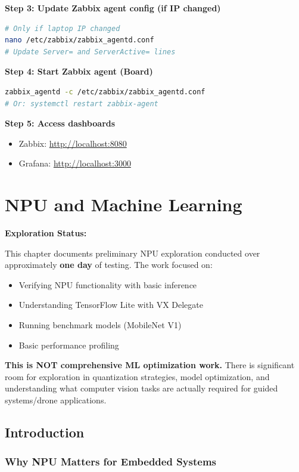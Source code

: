 \documentclass[12pt,a4paper]{report}
\begin{document}
\textbf{Step 3: Update Zabbix agent config (if IP changed)}
\begin{lstlisting}[language=bash]
# Only if laptop IP changed
nano /etc/zabbix/zabbix_agentd.conf
# Update Server= and ServerActive= lines
\end{lstlisting}

\textbf{Step 4: Start Zabbix agent (Board)}
\begin{lstlisting}[language=bash]
zabbix_agentd -c /etc/zabbix/zabbix_agentd.conf
# Or: systemctl restart zabbix-agent
\end{lstlisting}

\textbf{Step 5: Access dashboards}
\begin{itemize}
    \item Zabbix: \url{http://localhost:8080}
    \item Grafana: \url{http://localhost:3000}
\end{itemize}

\chapter{NPU and Machine Learning}

\begin{important}
\textbf{Exploration Status:}

This chapter documents preliminary NPU exploration conducted over approximately \textbf{one day} of testing. The work focused on:
\begin{itemize}
    \item Verifying NPU functionality with basic inference
    \item Understanding TensorFlow Lite with VX Delegate
    \item Running benchmark models (MobileNet V1)
    \item Basic performance profiling
\end{itemize}

\textbf{This is NOT comprehensive ML optimization work.} There is significant room for exploration in quantization strategies, model optimization, and understanding what computer vision tasks are actually required for guided systems/drone applications.
\end{important}

\section{Introduction}

\subsection{Why NPU Matters for Embedded Systems}
\end{document}
